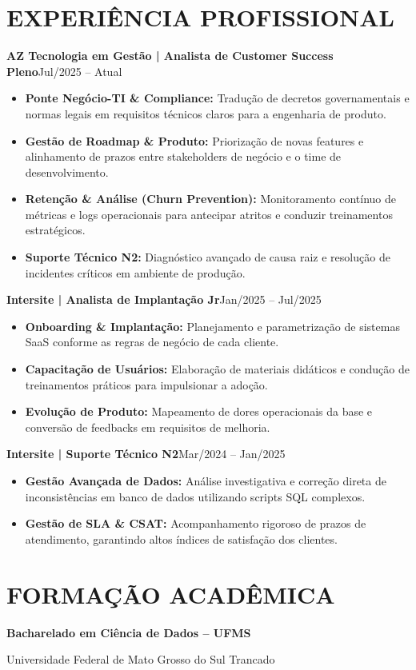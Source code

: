\documentclass[10pt,a4paper]{article}
\newcommand{\cargo}[3]{\par\textbf{#1 | #2}\hfill{\small\color{accent}#3}\par}
\begin{document}
\section*{EXPERIÊNCIA PROFISSIONAL}
\cargo{AZ Tecnologia em Gestão}{Analista de Customer Success Pleno}{Jul/2025 -- Atual}
\begin{itemize}
\item \textbf{Ponte Negócio-TI \& Compliance:} Tradução de decretos governamentais e normas legais em requisitos técnicos claros para a engenharia de produto.
\item \textbf{Gestão de Roadmap \& Produto:} Priorização de novas features e alinhamento de prazos entre stakeholders de negócio e o time de desenvolvimento.
\item \textbf{Retenção \& Análise (Churn Prevention):} Monitoramento contínuo de métricas e logs operacionais para antecipar atritos e conduzir treinamentos estratégicos.
\item \textbf{Suporte Técnico N2:} Diagnóstico avançado de causa raiz e resolução de incidentes críticos em ambiente de produção.
\end{itemize}
\cargo{Intersite}{Analista de Implantação Jr}{Jan/2025 -- Jul/2025}
\begin{itemize}
\item \textbf{Onboarding \& Implantação:} Planejamento e parametrização de sistemas SaaS conforme as regras de negócio de cada cliente.
\item \textbf{Capacitação de Usuários:} Elaboração de materiais didáticos e condução de treinamentos práticos para impulsionar a adoção.
\item \textbf{Evolução de Produto:} Mapeamento de dores operacionais da base e conversão de feedbacks em requisitos de melhoria.
\end{itemize}
\cargo{Intersite}{Suporte Técnico N2}{Mar/2024 -- Jan/2025}
\begin{itemize}
\item \textbf{Gestão Avançada de Dados:} Análise investigativa e correção direta de inconsistências em banco de dados utilizando scripts SQL complexos.
\item \textbf{Gestão de SLA \& CSAT:} Acompanhamento rigoroso de prazos de atendimento, garantindo altos índices de satisfação dos clientes.
\end{itemize}
\section*{FORMAÇÃO ACADÊMICA}
\textbf{Bacharelado em Ciência de Dados -- UFMS}\par
Universidade Federal de Mato Grosso do Sul \hfill Trancado
\end{document}
